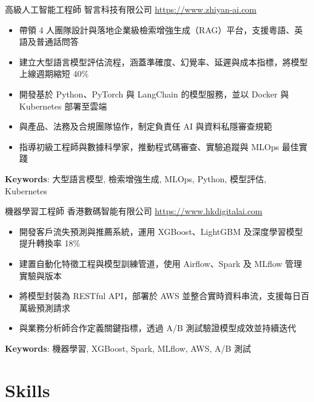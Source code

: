 \documentclass[a4paper, serif, 10pt]{moderncv}
\begin{document}
        {高級人工智能工程師}
        {智言科技有限公司}
        {\url{https://www.zhiyan-ai.com}}
        {}
        {\begin{itemize}
\item 帶領 4 人團隊設計與落地企業級檢索增強生成（RAG）平台，支援粵語、英語及普通話問答
\item 建立大型語言模型評估流程，涵蓋準確度、幻覺率、延遲與成本指標，將模型上線週期縮短 40\%
\item 開發基於 Python、PyTorch 與 LangChain 的模型服務，並以 Docker 與 Kubernetes 部署至雲端
\item 與產品、法務及合規團隊協作，制定負責任 AI 與資料私隱審查規範
\item 指導初級工程師與數據科學家，推動程式碼審查、實驗追蹤與 MLOps 最佳實踐
\end{itemize}
\textbf{Keywords}: 大型語言模型, 檢索增強生成, MLOps, Python, 模型評估, Kubernetes}

        {機器學習工程師}
        {香港數碼智能有限公司}
        {\url{https://www.hkdigitalai.com}}
        {}
        {\begin{itemize}
\item 開發客戶流失預測與推薦系統，運用 XGBoost、LightGBM 及深度學習模型提升轉換率 18\%
\item 建置自動化特徵工程與模型訓練管道，使用 Airflow、Spark 及 MLflow 管理實驗與版本
\item 將模型封裝為 RESTful API，部署於 AWS 並整合實時資料串流，支援每日百萬級預測請求
\item 與業務分析師合作定義關鍵指標，透過 A/B 測試驗證模型成效並持續迭代
\end{itemize}
\textbf{Keywords}: 機器學習, XGBoost, Spark, MLflow, AWS, A/B 測試}
\section{Skills}

\end{document}
